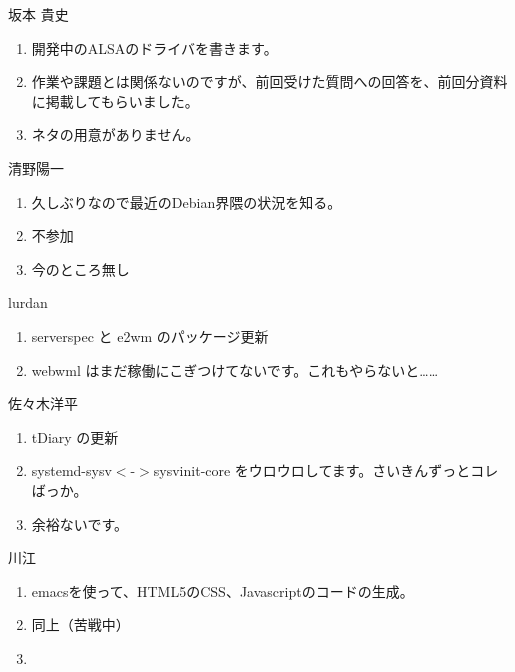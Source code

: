 \documentclass[mingoth,a4paper]{jsarticle}
\begin{document}
\begin{prework}{ 坂本 貴史 }
  \begin{enumerate}
  \item 開発中のALSAのドライバを書きます。
  \item 作業や課題とは関係ないのですが、前回受けた質問への回答を、前回分資料に掲載してもらいました。
  \item ネタの用意がありません。
  \end{enumerate}
\end{prework}

\begin{prework}{  清野陽一 }
  \begin{enumerate}
  \item 久しぶりなので最近のDebian界隈の状況を知る。
  \item 不参加
  \item 今のところ無し
  \end{enumerate}
\end{prework}

\begin{prework}{ lurdan }
  \begin{enumerate}
  \item serverspec と e2wm のパッケージ更新
  \item webwml はまだ稼働にこぎつけてないです。これもやらないと……
  \end{enumerate}
\end{prework}

\begin{prework}{ 佐々木洋平 }
  \begin{enumerate}
  \item tDiary の更新
  \item systemd-sysv$<$-$>$sysvinit-core をウロウロしてます。さいきんずっとコレばっか。
  \item 余裕ないです。
  \end{enumerate}
\end{prework}

\begin{prework}{ 川江 }
  \begin{enumerate}
  \item emacsを使って、HTML5のCSS、Javascriptのコードの生成。
  \item 同上（苦戦中）
  \item
  \end{enumerate}
\end{prework}

\end{document}
